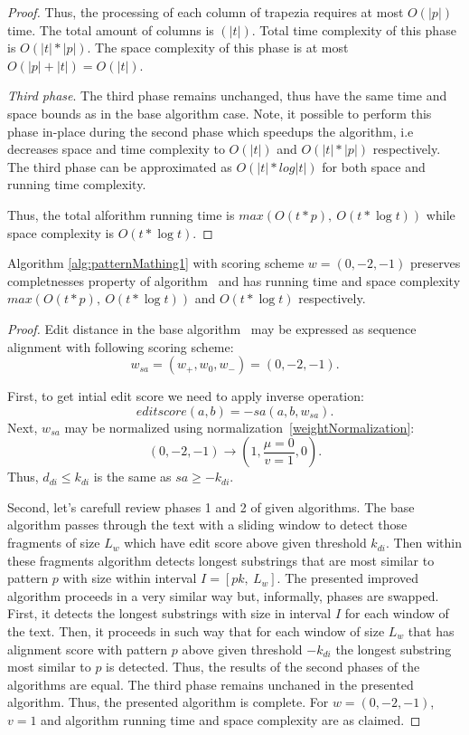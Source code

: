 \begin{proof}
Thus, the processing of each column of trapezia requires at most $O(|p|)$ time.
The total amount of columns is $(|t|)$.
Total time complexity of this phase is $O(|t|*|p|)$.
The space complexity of this phase is at most $O(|p|+|t|)=O(|t|)$.

\emph{Third phase}.
The third phase remains unchanged, thus have the same time and space bounds as in the base algorithm case.
Note, it possible to perform this phase in-place during the second phase which speedups the algorithm, i.e decreases space and time complexity to $O(|t|)$ and $O(|t|*|p|)$ respectively.
The third phase can be approximated as $O(|t| * log|t|)$ for both space and running time complexity.

Thus, the total alforithm running time is $max(O(t * p),\ O(t * \log t))$ while space complexity is $O(t * \log t)$.
\end{proof}

\begin{theorem}
Algorithm \ref{alg:patternMathing1} with scoring scheme $w = (0,-2,-1)$ preserves completnesses property of algorithm~\cite{luciv2019interactive} and has running time and space complexity $max(O(t*p),\ O(t* \log t))$ and $O(t *  \log t)$  respectively.
\end{theorem}

\begin{proof}
Edit distance in the base algorithm~\cite{luciv2019interactive} may be expressed as sequence alignment with following scoring scheme: 
$$w_{sa}=(w_{+},w_{0},w_{-}) = (0,-2,-1).$$

First, to get intial edit score we need to apply inverse operation:
$$editscore(a,b) = -sa(a,b,w_{sa}).$$
Next, $w_{sa}$ may be normalized using normalization~\ref{weightNormalization}:
$$(0, -2, -1) \rightarrow (1,\frac{\mu=0}{v=1}, 0).$$
Thus, $d_{di} \leq k_{di}$ is the same as $sa \geq -k_{di}$.

Second, let's carefull review phases 1 and 2 of given algorithms.
The base algorithm passes through the text with a sliding window to detect those fragments of size $L_{w}$ which have edit score above given threshold $k_{di}$.
Then within these fragments algorithm detects longest substrings that are most similar to pattern $p$ with size within interval $I=[pk,\ L_{w}]$.
The presented improved algorithm proceeds in a very similar way but, informally, phases are swapped.
First, it detects the longest substrings with size in interval $I$ for each window of the text.
Then, it proceeds in such way that for each window of size $L_{w}$ that has alignment score with pattern $p$ above given threshold $-k_{di}$  the longest substring most similar to $p$ is detected.
Thus, the results of the second phases of the algorithms are equal.
The third phase remains unchaned in the presented algorithm.
Thus, the presented algorithm is complete.
For $w = (0,-2,-1)$, $v=1$ and algorithm running time and space complexity are as claimed.
\end{proof}

